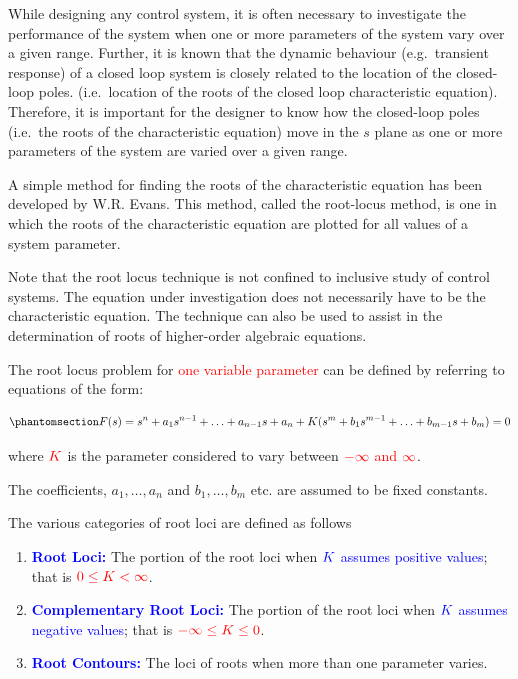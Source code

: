 \documentclass[
  14pt,
  a4paper,
  oneside,
  open=any,
  a4paper,
  14pt]{report}
\begin{document}
While designing any control system, it is often necessary to investigate
the performance of the system when one or more parameters of the system
vary over a given range. Further, it is known that the dynamic behaviour
(e.g.~transient response) of a closed loop system is closely related to
the location of the closed-loop poles. (i.e.~location of the roots of
the closed loop characteristic equation). Therefore, it is important for
the designer to know how the closed-loop poles (i.e.~the roots of the
characteristic equation) move in the \(s\) plane as one or more
parameters of the system are varied over a given range.

A simple method for finding the roots of the characteristic equation has
been developed by W.R. Evans. This method, called the root-locus method,
is one in which the roots of the characteristic equation are plotted for
all values of a system parameter.

Note that the root locus technique is not confined to inclusive study of
control systems. The equation under investigation does not necessarily
have to be the characteristic equation. The technique can also be used
to assist in the determination of roots of higher-order algebraic
equations.

The root locus problem for \textcolor{red}{one variable parameter} can
be defined by referring to equations of the form:

\begin{equation}\phantomsection\label{eq-root-locus-one-var}{
    F(s) = s^n +a_1s^{n-1} + \ldots + a_{n-1}s + a_n + K(s^m + b_1s^{m-1} + \ldots + b_{m-1}s + b_m) = 0
}\end{equation}

where \(\textcolor{red}{K}\) is the parameter considered to vary between
\(\textcolor{red}{-\infty}\) \textcolor{red}{and}
\(\textcolor{red}{\infty}\).

The coefficients, \(a_1, \ldots, a_n\) and \(b_1, \ldots, b_m\) etc. are
assumed to be fixed constants.

The various categories of root loci are defined as follows

\begin{enumerate}
\def\labelenumi{\arabic{enumi}.}
\item
  \textcolor{blue}{\textbf{Root Loci:}} The portion of the root loci
  when \(\textcolor{blue}{K}\) \textcolor{blue}{assumes positive
  values}; that is \(\textcolor{red}{0\leq K < \infty}\).
\item
  \textcolor{blue}{\textbf{Complementary Root Loci:}} The portion of the
  root loci when \(\textcolor{blue}{K}\) \textcolor{blue}{assumes
  negative values}; that is \(\textcolor{red}{-\infty \leq K \leq 0}\).
\item
  \textcolor{blue}{\textbf{Root Contours:}} The loci of roots when more
  than one parameter varies.
\end{enumerate}
\end{document}

